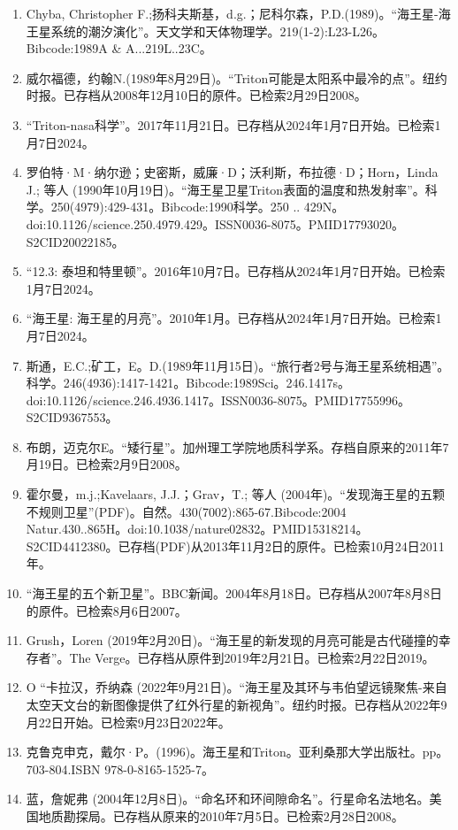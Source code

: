 \begin{enumerate}
\item Chyba, Christopher F.;扬科夫斯基，d.g.；尼科尔森，P.D.(1989)。“海王星-海王星系统的潮汐演化”。天文学和天体物理学。219(1-2):L23-L26。Bibcode:1989A & A...219L..23C。
\item 威尔福德，约翰N.(1989年8月29日)。“Triton可能是太阳系中最冷的点”。纽约时报。已存档从2008年12月10日的原件。已检索2月29日2008。
\item “Triton-nasa科学”。2017年11月21日。已存档从2024年1月7日开始。已检索1月7日2024。
\item 罗伯特·M·纳尔逊；史密斯，威廉·D；沃利斯，布拉德·D；Horn，Linda J.; 等人 (1990年10月19日)。“海王星卫星Triton表面的温度和热发射率”。科学。250(4979):429-431。Bibcode:1990科学。250 .. 429N。doi:10.1126/science.250.4979.429。ISSN0036-8075。PMID17793020。S2CID20022185。   
\item “12.3: 泰坦和特里顿”。2016年10月7日。已存档从2024年1月7日开始。已检索1月7日2024。
\item “海王星: 海王星的月亮”。2010年1月。已存档从2024年1月7日开始。已检索1月7日2024。
\item 斯通，E.C.;矿工，E。D.(1989年11月15日)。“旅行者2号与海王星系统相遇”。科学。246(4936):1417-1421。Bibcode:1989Sci。246.1417s。doi:10.1126/science.246.4936.1417。ISSN0036-8075。PMID17755996。S2CID9367553。   
\item 布朗，迈克尔E。“矮行星”。加州理工学院地质科学系。存档自原来的2011年7月19日。已检索2月9日2008。
\item 霍尔曼，m.j.;Kavelaars, J.J.；Grav，T.; 等人 (2004年)。“发现海王星的五颗不规则卫星”(PDF)。自然。430(7002):865-67.Bibcode:2004 Natur.430..865H。doi:10.1038/nature02832。PMID15318214。S2CID4412380。已存档(PDF)从2013年11月2日的原件。已检索10月24日2011年。   
\item “海王星的五个新卫星”。BBC新闻。2004年8月18日。已存档从2007年8月8日的原件。已检索8月6日2007。
\item Grush，Loren (2019年2月20日)。“海王星的新发现的月亮可能是古代碰撞的幸存者”。The Verge。已存档从原件到2019年2月21日。已检索2月22日2019。
\item O “卡拉汉，乔纳森 (2022年9月21日)。“海王星及其环与韦伯望远镜聚焦-来自太空天文台的新图像提供了红外行星的新视角”。纽约时报。已存档从2022年9月22日开始。已检索9月23日2022年。
\item 克鲁克申克，戴尔·P。(1996)。海王星和Triton。亚利桑那大学出版社。pp。 703-804.ISBN 978-0-8165-1525-7。
\item 蓝，詹妮弗 (2004年12月8日)。“命名环和环间隙命名”。行星命名法地名。美国地质勘探局。已存档从原来的2010年7月5日。已检索2月28日2008。

\end{enumerate}
